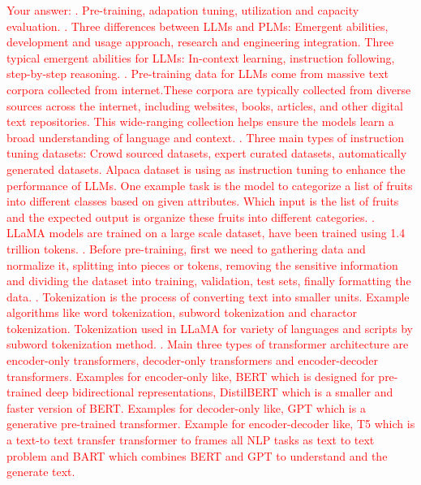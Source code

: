 \textcolor{red}{
Your answer: . Pre-training, adapation tuning, utilization and capacity evaluation.
. Three differences between LLMs and PLMs: Emergent abilities, development and usage approach, research and engineering integration. Three typical emergent abilities for LLMs: In-context learning, instruction following, step-by-step reasoning.
. Pre-training data for LLMs come from massive text corpora collected from internet.These corpora are typically collected from diverse sources across the internet, including websites, books, articles, and other digital text repositories. This wide-ranging collection helps ensure the models learn a broad understanding of language and context.
. Three main types of instruction tuning datasets: Crowd sourced datasets, expert curated datasets, automatically generated datasets. Alpaca dataset is using as instruction tuning to enhance the performance of LLMs. One example task is the model to categorize a list of fruits into different classes based on given attributes. Which input is the list of fruits and the expected output is organize these fruits into different categories.
. LLaMA models are trained on a large scale dataset, have been trained using 1.4 trillion tokens.
. Before pre-training, first we need to gathering data and normalize it, splitting into pieces or tokens, removing the sensitive information and dividing the dataset into training, validation, test sets, finally formatting the data.
. Tokenization is the process of converting text into smaller units. Example algorithms like word tokenization, subword tokenization and charactor tokenization. Tokenization used in LLaMA for variety of languages and scripts by subword tokenization method.
. Main three types of transformer architecture are encoder-only transformers, decoder-only transformers and encoder-decoder transformers. Examples for encoder-only like, BERT which is designed for pre-trained deep bidirectional representations, DistilBERT which is a smaller and faster version of BERT. Examples for decoder-only like, GPT which is a generative pre-trained transformer. Example for encoder-decoder like, T5 which is a text-to text transfer transformer to frames all NLP tasks as text to text problem and BART which combines BERT and GPT to understand and the generate text.
}
